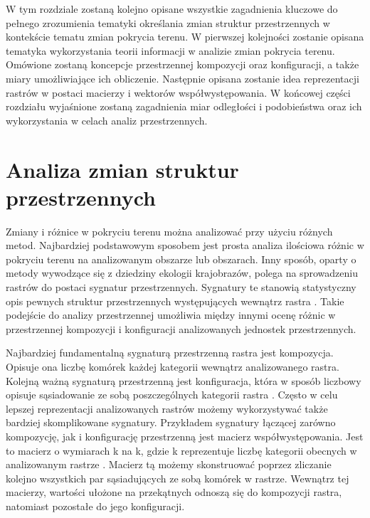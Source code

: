 \documentclass{amuthesis}
\begin{document}
W tym rozdziale zostaną kolejno opisane wszystkie zagadnienia kluczowe
do pełnego zrozumienia tematyki określania zmian struktur przestrzennych
w kontekście tematu zmian pokrycia terenu. W pierwszej kolejności
zostanie opisana tematyka wykorzystania teorii informacji w analizie
zmian pokrycia terenu. Omówione zostaną koncepcje przestrzennej
kompozycji oraz konfiguracji, a także miary umożliwiające ich
obliczenie. Następnie opisana zostanie idea reprezentacji rastrów w
postaci macierzy i wektorów współwystępowania. W końcowej części
rozdziału wyjaśnione zostaną zagadnienia miar odległości i podobieństwa
oraz ich wykorzystania w celach analiz przestrzennych.

\hypertarget{analiza-zmian-struktur-przestrzennych}{%
\section{Analiza zmian struktur
przestrzennych}\label{analiza-zmian-struktur-przestrzennych}}

Zmiany i różnice w pokryciu terenu można analizować przy użyciu różnych
metod. Najbardziej podstawowym sposobem jest prosta analiza ilościowa
różnic w pokryciu terenu na analizowanym obszarze lub obszarach. Inny
sposób, oparty o metody wywodzące się z dziedziny ekologii krajobrazów,
polega na sprowadzeniu rastrów do postaci sygnatur przestrzennych.
Sygnatury te stanowią statystyczny opis pewnych struktur przestrzennych
występujących wewnątrz rastra \autocite{nowosad_motif,Jasiewicz_GeoPAT}.
Takie podejście do analizy przestrzennej umożliwia między innymi ocenę
różnic w przestrzennej kompozycji i konfiguracji analizowanych jednostek
przestrzennych.

Najbardziej fundamentalną sygnaturą przestrzenną rastra jest kompozycja.
Opisuje ona liczbę komórek każdej kategorii wewnątrz analizowanego
rastra. Kolejną ważną sygnaturą przestrzenną jest konfiguracja, która w
sposób liczbowy opisuje sąsiadowanie ze sobą poszczególnych kategorii
rastra \autocite{Gustafson1998}. Często w celu lepszej reprezentacji
analizowanych rastrów możemy wykorzystywać także bardziej skomplikowane
sygnatury. Przykładem sygnatury łączącej zarówno kompozycję, jak i
konfigurację przestrzenną jest macierz współwystępowania. Jest to
macierz o wymiarach k na k, gdzie k reprezentuje liczbę kategorii
obecnych w analizowanym rastrze
\autocite{Haralick_1973,Jasiewicz_GeoPAT}. Macierz tą możemy
skonstruować poprzez zliczanie kolejno wszystkich par sąsiadujących ze
sobą komórek w rastrze. Wewnątrz tej macierzy, wartości ułożone na
przekątnych odnoszą się do kompozycji rastra, natomiast pozostałe do
jego konfiguracji.
\end{document}
